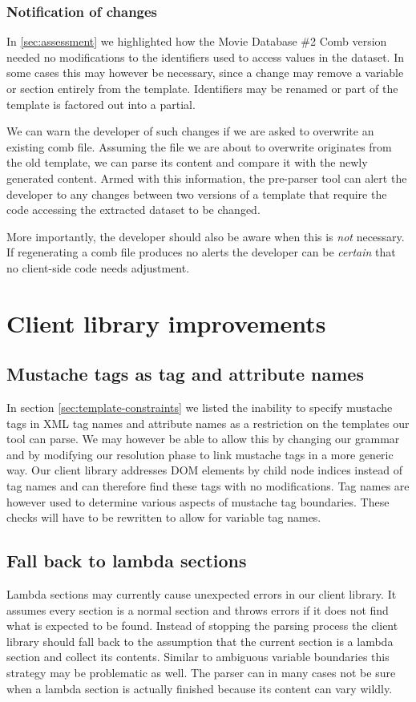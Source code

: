\documentclass[thesis.tex]{subfiles}
\begin{document}
\subsubsection{Notification of changes}
In \ref{sec:assessment} we highlighted how the Movie Database \#2 Comb version
needed no modifications to the identifiers used to access values in the dataset.
In some cases this may however be necessary, since a change may remove
a variable or section entirely from the template. Identifiers may be renamed or
part of the template is factored out into a partial.

We can warn the developer of such changes if we are asked to overwrite an
existing comb file. Assuming the file we are about to overwrite originates from
the old template, we can parse its content and compare it with the newly
generated content. Armed with this information, the pre-parser tool can alert
the developer to any changes between two versions of a template that require the
code accessing the extracted dataset to be changed.

More importantly, the developer should also be aware when this is \emph{not}
necessary. If regenerating a comb file produces no alerts the developer can
be \emph{certain} that no client-side code needs adjustment.




\section{Client library improvements}

\subsection{Mustache tags as tag and attribute names}
In section \ref{sec:template-constraints} we listed the inability to specify
mustache tags in XML tag names and attribute names as a restriction on the
templates our tool can parse. We may however be able to allow this by changing
our grammar and by modifying our resolution phase to link mustache tags in a
more generic way.
Our client library addresses DOM elements by child node indices instead of tag
names and can therefore find these tags with no modifications. Tag names are
however used to determine various aspects of mustache tag boundaries. These
checks will have to be rewritten to allow for variable tag names.

\subsection{Fall back to lambda sections}
Lambda sections may currently cause unexpected errors in our client library.
It assumes every section is a normal section and throws errors if it does not
find what is expected to be found. Instead of stopping the parsing process
the client library should fall back to the assumption that the current section
is a lambda section and collect its contents. Similar to ambiguous variable
boundaries this strategy may be problematic as well. The parser can in many
cases not be sure when a lambda section is actually finished because its content
can vary wildly.
\end{document}
